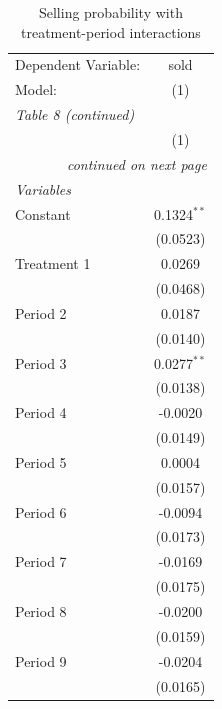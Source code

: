 
\begingroup
\centering
\scriptsize
\begin{longtable}{lc}
\caption{Selling probability with treatment-period interactions}
\label{tab:selling_timing_treatment_interactions} \\
   \midrule \midrule
   Dependent Variable:             & sold\\
   Model:                          & (1)\\
   \midrule
\endfirsthead
\multicolumn{2}{l}{\emph{Table 8 (continued)}} \\
   \midrule \midrule
                                   & (1)\\
   \midrule
\endhead
   \midrule
   \multicolumn{2}{r}{\emph{continued on next page}} \\
\endfoot
\endlastfoot
   \emph{Variables}\\
   Constant                        & 0.1324$^{**}$\\
                                   & (0.0523)\\
   Treatment 1                     & 0.0269\\
                                   & (0.0468)\\
   Period 2                        & 0.0187\\
                                   & (0.0140)\\
   Period 3                        & 0.0277$^{**}$\\
                                   & (0.0138)\\
   Period 4                        & -0.0020\\
                                   & (0.0149)\\
   Period 5                        & 0.0004\\
                                   & (0.0157)\\
   Period 6                        & -0.0094\\
                                   & (0.0173)\\
   Period 7                        & -0.0169\\
                                   & (0.0175)\\
   Period 8                        & -0.0200\\
                                   & (0.0159)\\
   Period 9                        & -0.0204\\
                                   & (0.0165)\\

\end{longtable}

